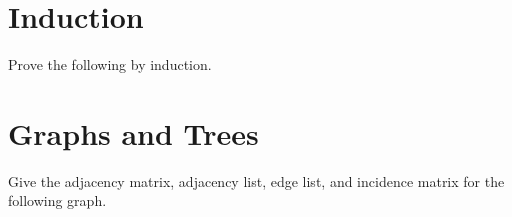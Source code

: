 \documentclass[solutionorbox,answers]{exam}
\begin{document}
\begin{questions}
\begin{solutionbox}{3in}

\end{solutionbox}

\section*{Induction}
\label{sec:induction}

\question
Prove the following by induction.


\section*{Graphs and Trees}
\label{sec:graphs-trees}

\question 
Give the adjacency matrix, adjacency list, edge list, and incidence matrix for the following graph. \\
\begin{minipage}{0.3\linewidth}
\end{minipage}
\qquad
\begin{minipage}{0.6\linewidth}
\begin{solutionbox}{3.8in}\\


\end{solutionbox}
\end{minipage}
\end{questions}
\end{document}
